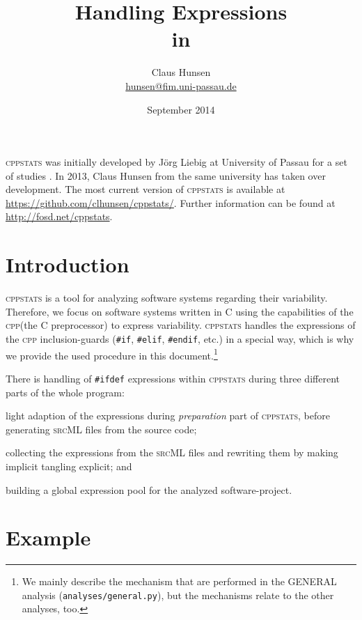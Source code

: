 \documentclass[a4paper]{scrartcl}
\title{Handling \ifdef Expressions\\in \cppstats}
\author{Claus Hunsen\\\url{hunsen@fim.uni-passau.de}}
\date{September 2014}
\newcommand\code[1]{\texttt{#1}}
\newcommand\tool[1]{\textsc{#1}}
\newcommand\ifdeff[1]{\code{\##1}\xspace}
\newcommand\ifdef[0]{{\upshape\ifdeff{ifdef}}\xspace}
\newcommand\cppstats[0]{\tool{cppstats}\xspace}
\newcommand\cpp{\tool{cpp}\xspace}
\begin{document}
\maketitle



\begin{footnotesize}
\noindent \cppstats was initially developed by J\"org Liebig at University of Passau for a set of studies \cite{LiebigALKS10,LiebigKA11}.
In 2013, Claus Hunsen from the same university has taken over development.
The most current version of \cppstats is available at \url{https://github.com/clhunsen/cppstats/}.
Further information can be found at \url{http://fosd.net/cppstats}.
\end{footnotesize}

\section{Introduction}
\cppstats is a tool for analyzing software systems regarding their variability.
Therefore, we focus on software systems written in \tool{C} using the capabilities of the \cpp (the \tool{C} preprocessor) to express variability.
\cppstats handles the expressions of the \cpp inclusion-guards (\ifdeff{if}, \ifdeff{elif}, \ifdeff{endif}, etc.) in a special way, which is why we provide the used procedure in this document.\footnote{We mainly describe the mechanism that are performed in the \tool{GENERAL} analysis (\code{analyses/general.py}), but the mechanisms relate to the other analyses, too.}

There is handling of \ifdef expressions within \cppstats during three different parts of the whole program:
\begin{inparaenum}[\itshape 1\upshape)]
\item light adaption of the expressions during \textit{preparation} part of \cppstats, before generating \tool{srcML} files from the source code;
\item collecting the expressions from the \tool{srcML} files and rewriting them by making implicit tangling explicit; and
\item building a global expression pool for the analyzed software-project.
\end{inparaenum}



\section{Example}
\end{document}
